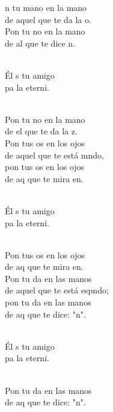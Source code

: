 \documentclass[12pt]{article}
\begin{document}
\begin{multicols*}{2}
\begin{cancion}%
	n tu mano en la mano \\
	de aquel que te da la o.\\
	Pon tu no en la mano \\
	de al que te dice n.\\\jump\\
	\begin{chorus}%
	Él s tu amigo \\
	pa la eterni.\\
	\end{chorus}%
	\jump\\
	Pon tu no en la mano \\
	de el que te da la z.\\
	Pon tus os en los ojos\\
	de aquel que te está mndo,\\
	pon tus os en los ojos \\
	de aq que te mira en.\\\jump\\
	\begin{chorus}%
	Él s tu amigo \\
	pa la eterni.\\
	\end{chorus}%
	\jump\\
	Pon tus os en los ojos \\
	de aq que te mira en.\\
	Pon tu da en las manos\\
	de aquel que te está espndo;\\
	pon tu da en las manos\\
	de aq que te dice: "n".\\\jump\\
	\begin{chorus}%
	Él s tu amigo \\
	pa la eterni.\\
	\end{chorus}%
	\jump\\
	Pon tu da en las manos\\
	de aq que te dice: "n".\\
\end{cancion}%


\end{multicols*}
\end{document}
